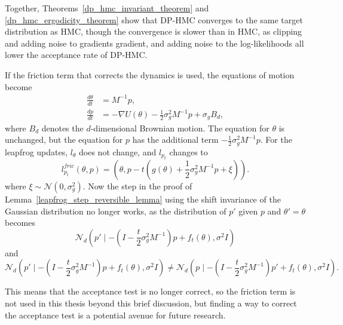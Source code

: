 \documentclass[english,twoside,openright]{HYgraduMLDS}
\newcommand{\caln}{{\mathcal{N}}}
\begin{document}
Together, Theorems~\ref{dp_hmc_invariant_theorem} and \ref{dp_hmc_ergodicity_theorem}
show that DP-HMC converges to the same target distribution as HMC, though
the convergence is slower than in HMC, as clipping and adding noise to
gradients gradient, and adding noise to the log-likelihoods all lower the
acceptance rate of DP-HMC.

If the friction term that corrects the dynamics is used, the equations of
motion become~\cite{CFG14}
\begin{align*}
  \frac{d\theta}{dt} &= M^{-1}p, \\
  \frac{dp}{dt} &= -\nabla U(\theta) - \frac{1}{2}\sigma_{g}^{2}M^{-1}p + \sigma_{g}B_{d},
\end{align*}
where \(B_{d}\) denotes the \(d\)-dimensional Brownian motion.
The equation for \(\theta\) is unchanged, but the equation for \(p\) has the
additional term \(-\frac{1}{2}\sigma_{g}^{2}M^{-1}p\).
For the leapfrog updates, \(l_{\theta}\) does not change, and \(l_{p_{t}}\) changes
to
\[
  l_{p_{t}}^{fric}(\theta, p) = \left(\theta, p - t(g(\theta)
  + \frac{1}{2}\sigma_{g}^{2}M^{-1}p + \xi)\right).
\]
where \(\xi \sim \caln(0, \sigma_{g}^{2})\).
Now the step in the proof of Lemma~\ref{leapfrog_step_reversible_lemma}
using the shift invariance of the Gaussian distribution no longer works,
as the distribution of \(p'\) given \(p\) and \(\theta' = \theta\) becomes
\[
  \caln_{d}\left(p'\mid - \left(I - \frac{t}{2}\sigma_{g}^{2}M^{-1}\right)p
    + f_{t}(\theta), \sigma^{2}I\right)
\]
and
\[
  \caln_{d}\left(p'\mid - \left(I - \frac{t}{2}\sigma_{g}^{2}M^{-1}\right)p
    + f_{t}(\theta), \sigma^{2}I\right)
  \neq \caln_{d}\left(p\mid - \left(I - \frac{t}{2}\sigma_{g}^{2}M^{-1}\right)p'
    + f_{t}(\theta), \sigma^{2}I\right).
\]

This means that the acceptance test is no longer correct, so
the friction term is not used in this thesis beyond this brief discussion,
but finding a way to correct the acceptance test is a potential avenue for
future research.
\end{document}
